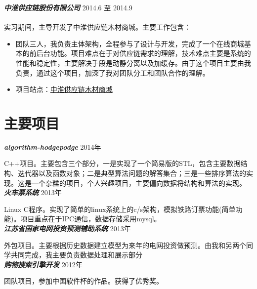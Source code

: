\documentclass[10pt]{article} %
\begin{document}
\begin{minipage}[t]{0.6\textwidth}
{\bf \large \textit{中淮供应链股份有限公司}} \hfill  \hfill {2014.6 至 2014.9\\}\\
{实习期间，主导开发了中淮供应链木材商城。主要工作包含：}
\begin{itemize} \itemsep -1pt
\item 团队三人，我负责主体架构，全程参与了设计与开发，完成了一个在线商城基本的前后台功能。项目难点在于对供应链需求的理解，技术难点主要是系统的性能和稳定性，主要解决手段是动静分离以及加缓存。由于这个项目主要由我负责，通过这个项目，加深了我对团队分工和团队合作的理解。
\item 项目站点：\href{http://www.zhchain.com}{中淮供应链木材商城}
\end{itemize}



\section{主要项目}

{\bf \large \textit{algorithm-hodgepodge}} \hfill  \hfill {2014年\\}

\normalsize{C++项目。主要包含三个部分，一是实现了一个简易版的STL，包含主要数据结构、迭代器以及函数对象；二是典型算法问题的解答集合；三是一些排序算法的实现。这是一个杂糅的项目，个人兴趣项目，主要偏向数据将结构和算法的实现。}\\

{\bf \large \textit{火车票系统}} \hfill  \hfill {2013年\\}

\normalsize{Linux C程序。实现了简单的linux系统上的c/s架构，模拟铁路订票功能(简单功能)。项目重点在于IPC通信，数据存储采用mysql。}\\


{\bf \large \textit{江苏省国家电网投资预测辅助系统}} \hfill  \hfill {2013年\\}

\normalsize{外包项目。主要根据历史数据建立模型为来年的电网投资做预测。由我和另两个同学共同完成，我主要负责数据处理和展示部分}\\

{\bf \large \textit{购物搜索引擎开发}} \hfill  \hfill {2012年\\}

\normalsize{团队项目，参加中国软件杯的作品。获得了优秀奖。}\\




\end{minipage} %
\end{document}

